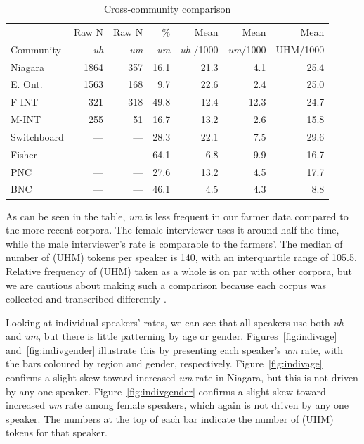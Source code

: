 \documentclass[11pt]{article}
\begin{document}
\begin{table}[ht!]
    \centering
    \begin{tabular}{lrrrrrr}
        \toprule
                    & Raw N       & Raw N       & \%          & Mean              & Mean             & Mean     \\
        Community   & \textit{uh} & \textit{um} & \textit{um} & \textit{uh} /1000 & \textit{um}/1000 & UHM/1000 \\
        \midrule
        Niagara     & 1864        & 357         & 16.1        & 21.3              & 4.1              & 25.4     \\
        E. Ont.     & 1563        & 168         & 9.7         & 22.6              & 2.4              & 25.0     \\
        F-INT       & 321         & 318         & 49.8        & 12.4              & 12.3             & 24.7     \\
        M-INT       & 255         & 51          & 16.7        & 13.2              & 2.6              & 15.8     \\
        \midrule
        Switchboard & ---         & ---         & 28.3        & 22.1              & 7.5              & 29.6     \\
        Fisher      & ---         & ---         & 64.1        & 6.8               & 9.9              & 16.7     \\
        PNC         & ---         & ---         & 27.6        & 13.2              & 4.5              & 17.7     \\
        BNC         & ---         & ---         & 46.1        & 4.5               & 4.3              & 8.8      \\
        \bottomrule
    \end{tabular}
    \caption{Cross-community comparison}
    \label{t:comparison}
\end{table}

As can be seen in the table, \emph{um} is less frequent in our farmer data
compared to the more recent corpora.
The female interviewer uses it around half the time, while the male
interviewer's rate is comparable to the farmers'.
The median of number of (UHM) tokens per speaker is 140, with an interquartile
range of 105.5.
Relative frequency of (UHM) taken as a whole is on par with other corpora, but
we are cautious about making such a comparison because each corpus was collected
and transcribed differently \parencite[for related discussion,
see][]{pichler2010}.

Looking at individual speakers' rates, we can see that all speakers use both
\emph{uh} and \emph{um}, but there is little patterning by age or gender.
Figures~\ref{fig:indivage} and~\ref{fig:indivgender} illustrate this by
presenting each speaker's \emph{um} rate, with the bars coloured by region and
gender, respectively.
Figure~\ref{fig:indivage} confirms a slight skew toward increased \emph{um} rate
in Niagara, but this is not driven by any one speaker.
Figure~\ref{fig:indivgender} confirms a slight skew toward increased \emph{um}
rate among female speakers, which again is not driven by any one speaker.
The numbers at the top of each bar indicate the number of (UHM) tokens for that
speaker.
\end{document}
